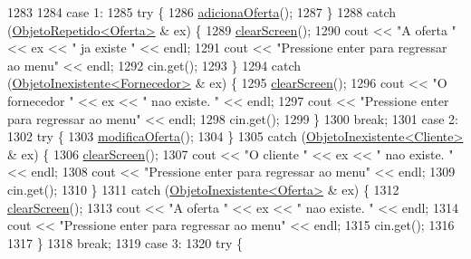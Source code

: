 \begin{DoxyCode}
1283 
1284         \textcolor{keywordflow}{case} 1:
1285             \textcolor{keywordflow}{try} \{
1286                 \hyperlink{classEmpresa_ae244a8ae3afb85eb5e9e5febce8b8728}{adicionaOferta}();
1287             \}
1288             \textcolor{keywordflow}{catch} (\hyperlink{classObjetoRepetido}{ObjetoRepetido<Oferta>} & ex) \{
1289                 \hyperlink{menu_8h_aceb70c1ed7e11f0863a868704f02214b}{clearScreen}();
1290                 cout << \textcolor{stringliteral}{"A oferta "} << ex << \textcolor{stringliteral}{" ja existe "} << endl;
1291                 cout << \textcolor{stringliteral}{"Pressione enter para regressar ao menu"} << endl;
1292                 cin.get();
1293             \}
1294             \textcolor{keywordflow}{catch} (\hyperlink{classObjetoInexistente}{ObjetoInexistente<Fornecedor>} & ex) \{
1295                 \hyperlink{menu_8h_aceb70c1ed7e11f0863a868704f02214b}{clearScreen}();
1296                 cout << \textcolor{stringliteral}{"O fornecedor "} << ex << \textcolor{stringliteral}{" nao existe. "} << endl;
1297                 cout << \textcolor{stringliteral}{"Pressione enter para regressar ao menu"} << endl;
1298                 cin.get();
1299             \}
1300             \textcolor{keywordflow}{break};
1301         \textcolor{keywordflow}{case} 2:
1302             \textcolor{keywordflow}{try} \{
1303                 \hyperlink{classEmpresa_ac8948065c65d5c02cb30103118f502d4}{modificaOferta}();
1304             \}
1305             \textcolor{keywordflow}{catch} (\hyperlink{classObjetoInexistente}{ObjetoInexistente<Cliente>} & ex) \{
1306                 \hyperlink{menu_8h_aceb70c1ed7e11f0863a868704f02214b}{clearScreen}();
1307                 cout << \textcolor{stringliteral}{"O cliente "} << ex << \textcolor{stringliteral}{" nao existe. "} << endl;
1308                 cout << \textcolor{stringliteral}{"Pressione enter para regressar ao menu"} << endl;
1309                 cin.get();
1310             \}
1311             \textcolor{keywordflow}{catch} (\hyperlink{classObjetoInexistente}{ObjetoInexistente<Oferta>} & ex) \{
1312                 \hyperlink{menu_8h_aceb70c1ed7e11f0863a868704f02214b}{clearScreen}();
1313                 cout << \textcolor{stringliteral}{"A oferta "} << ex << \textcolor{stringliteral}{" nao existe. "} << endl;
1314                 cout << \textcolor{stringliteral}{"Pressione enter para regressar ao menu"} << endl;
1315                 cin.get();
1316 
1317             \}
1318             \textcolor{keywordflow}{break};
1319         \textcolor{keywordflow}{case} 3:
1320             \textcolor{keywordflow}{try} \{

\end{DoxyCode}
